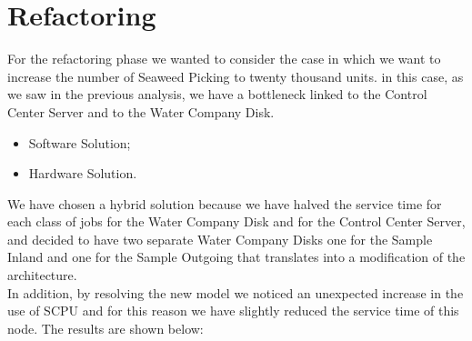 \section{Refactoring}

For the refactoring phase we wanted to consider the case in which we want to increase the number of Seaweed Picking to twenty thousand units. in this case, as we saw in the previous analysis, we have a bottleneck linked to the Control Center Server and to the Water Company Disk.

\begin{itemize}
	\item Software Solution;
	\item Hardware Solution.
\end{itemize}

We have chosen a hybrid solution because we have halved the service time for each class of jobs for the Water Company Disk and for the Control Center Server, and decided to have two separate Water Company Disks one for the Sample Inland and one for the Sample Outgoing that translates into a modification of the architecture.\\
In addition, by resolving the new model we noticed an unexpected increase in the use of SCPU and for this reason we have slightly reduced the service time of this node. The results are shown below:

\bigskip
\begin{center}
\end{center}

